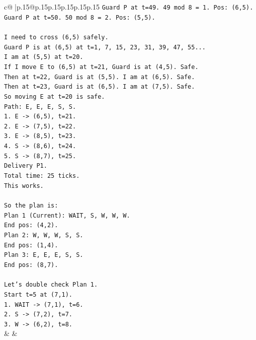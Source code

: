 \documentclass{article}
\begin{document}
{\begin{supertabular}{c@{$\;$}|p{.15\linewidth}@{}p{.15\linewidth}p{.15\linewidth}p{.15\linewidth}p{.15\linewidth}p{.15\linewidth}}
{{{\texttt{Guard P at t=49. 49 mod 8 = 1. Pos: (6,5).} \\
\texttt{Guard P at t=50. 50 mod 8 = 2. Pos: (5,5).} \\
\\ 
\texttt{I need to cross (6,5) safely.} \\
\texttt{Guard P is at (6,5) at t=1, 7, 15, 23, 31, 39, 47, 55...} \\
\texttt{I am at (5,5) at t=20.} \\
\texttt{If I move E to (6,5) at t=21, Guard is at (4,5). Safe.} \\
\texttt{Then at t=22, Guard is at (5,5). I am at (6,5). Safe.} \\
\texttt{Then at t=23, Guard is at (6,5). I am at (7,5). Safe.} \\
\texttt{So moving E at t=20 is safe.} \\
\texttt{Path: E, E, E, S, S.} \\
\texttt{1. E {-}> (6,5), t=21.} \\
\texttt{2. E {-}> (7,5), t=22.} \\
\texttt{3. E {-}> (8,5), t=23.} \\
\texttt{4. S {-}> (8,6), t=24.} \\
\texttt{5. S {-}> (8,7), t=25.} \\
\texttt{Delivery P1.} \\
\texttt{Total time: 25 ticks.} \\
\texttt{This works.} \\
\\ 
\texttt{So the plan is:} \\
\texttt{Plan 1 (Current): WAIT, S, W, W, W.} \\
\texttt{End pos: (4,2).} \\
\texttt{Plan 2: W, W, W, S, S.} \\
\texttt{End pos: (1,4).} \\
\texttt{Plan 3: E, E, E, S, S.} \\
\texttt{End pos: (8,7).} \\
\\ 
\texttt{Let's double check Plan 1.} \\
\texttt{Start t=5 at (7,1).} \\
\texttt{1. WAIT {-}> (7,1), t=6.} \\
\texttt{2. S {-}> (7,2), t=7.} \\
\texttt{3. W {-}> (6,2), t=8.} \\
            }
        }
    }
    & & \\ \\


\end{supertabular}}
\end{document}
